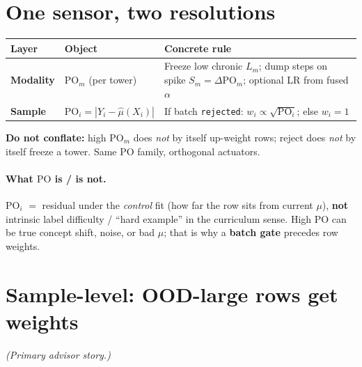 \documentclass[11pt]{article}
\newcommand{\PO}{\mathrm{PO}}
\begin{document}
\section{One sensor, two resolutions}
\label{sec:two}

\begin{center}
\small
\begin{tabular}{@{}llp{5.2cm}@{}}
\toprule
Layer & Object & Concrete rule \\
\midrule
\textbf{Modality}
  & $\PO_m$ (per tower)
  & Freeze low chronic $L_m$; dump steps on spike $S_m{=}\Delta\PO_m$;
    optional LR from fused $\alpha$ \\
\textbf{Sample}
  & $\PO_i=|Y_i-\hat\mu(X_i)|$
  & If batch \texttt{rejected}: $w_i\propto\sqrt{\PO_i}$;
    else $w_i=1$ \\
\bottomrule
\end{tabular}
\end{center}

\noindent\textbf{Do not conflate:}
high $\PO_m$ does \emph{not} by itself up-weight rows;
reject does \emph{not} by itself freeze a tower.
Same PO family, orthogonal actuators.

\paragraph{What $\PO$ is / is not.}
$\PO_i$ $=$ residual under the \emph{control} fit (how far the row sits
from current $\mu$), \textbf{not} intrinsic label difficulty / ``hard
example'' in the curriculum sense.
High $\PO$ can be true concept shift, noise, or bad $\mu$; that is why
a \textbf{batch gate} precedes row weights.

\section{Sample-level: OOD-large rows get weights}
\label{sec:sample}
\textit{(Primary advisor story.)}
\end{document}

